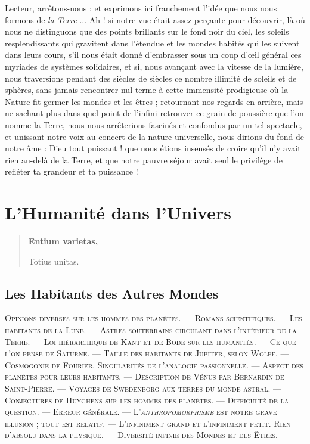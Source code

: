 \documentclass[a4paper, 11pt, oneside, landscape]{article}
\begin{document}
Lecteur, arrêtons-nous ; et exprimons ici franchement l'idée que nous nous formons de \emph{la Terre} ... Ah ! si notre vue était assez perçante pour découvrir, là où nous ne distinguons que des points brillants sur le fond noir du ciel, les soleils resplendissants qui gravitent dans l'étendue et les mondes habités qui les suivent dans leurs cours, s'il nous était donné d'embrasser sous un coup d'œil général ces myriades de systèmes solidaires, et si, nous avançant avec la vitesse de la lumière, nous traversions pendant des siècles de siècles ce nombre illimité de soleils et de sphères, sans jamais rencontrer nul terme à cette immensité prodigieuse où la Nature fit germer les mondes et les êtres ; retournant nos regards en arrière, mais ne sachant plus dans quel point de l'infini retrouver ce grain de poussière que l'on nomme la Terre, nous nous arrêterions fascinés et confondus par un tel spectacle, et unissant notre voix au concert de la nature universelle, nous dirions du fond de notre âme : Dieu tout puissant ! que nous étions insensés de croire qu'il n'y avait rien au-delà de la Terre, et que notre pauvre séjour avait seul le privilège de refléter ta grandeur et ta puissance !
\clearpage
\section{L'Humanité dans l'Univers}
\begin{quotation}\bfseries\small
Entium varietas,

Totius unitas.
\end{quotation}

\bigskip

\subsection{Les Habitants des Autres Mondes}
\begin{center}
\scshape
\small
Opinions diverses sur les hommes des planètes. --- Romans scientifiques. --- Les habitants de la Lune. --- Astres souterrains circulant dans l'intérieur de la Terre. --- Loi hiérarchique de Kant et de Bode sur les humanités. --- Ce que l'on pense de Saturne. --- Taille des habitants de Jupiter, selon Wolff. --- Cosmogonie de Fourier. Singularités de l'analogie passionnelle. --- Aspect des planètes pour leurs habitants. --- Description de Vénus par Bernardin de Saint-Pierre. --- Voyages de Swedenborg aux terres du monde astral. --- Conjectures de Huyghens sur les hommes des planètes. --- Difficulté de la question. --- Erreur générale. --- L'\emph{anthropomorphisme} est notre grave illusion ; tout est relatif. --- L'infiniment grand et l'infiniment petit. Rien d'absolu dans la physique. --- Diversité infinie des Mondes et des Êtres.
\end{center}
\end{document}
